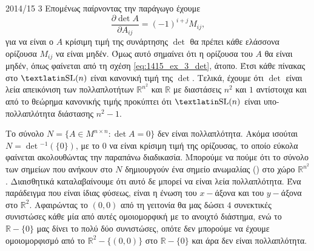 \documentclass[a4paper,11pt]{article}
\begin{document}
\begin{solution}{2014/15 3}
    Επομένως παίρνοντας την παράγωγο έχουμε
    \begin{equation*}
        \dfrac{\partial \det A}{\partial A_{ij}} =
        (-1)^{i+j}M_{ij},
    \end{equation*}
    για να είναι ο \( A \) κρίσιμη τιμή της συνάρτησης \( \det \) θα πρέπει κάθε
    ελάσσονα ορίζουσα \( M_{ij} \) να είναι μηδέν. Όμως αυτό σημαίνει
    ότι η ορίζουσα του \( A \) θα είναι μηδέν, όπως φαίνεται από τη σχέση
    \eqref{eq:1415_ex_3_det}, άτοπο. Έτσι κάθε πίνακας στο \(\text{\tl{SL}}(n)\) είναι
    κανονική τιμή της \( \det \). Τελικά, έχουμε ότι \( \det \) είναι λεία
    απεικόνιση των πολλαπλοτήτων \( \mathbb{R}^{n^2} \) και \( \mathbb{R} \)
    με διαστάσεις \( n^2 \) και \( 1 \) αντίστοιχα και από το θεώρημα κανονικής τιμής
    προκύπτει ότι \(\text{\tl{SL}}(n)\) είναι υπο-πολλαπλότητα διάστασης \( n^2 - 1 \).

    Το σύνολο \( N = \{A \in M^{n \times n}: \det A = 0 \} \) δεν είναι
    πολλαπλότητα. Ακόμα ισούται \( N = \det{}^{-1}(\{0\}) \), με το \(0\) να
    είναι κρίσιμη τιμή της ορίζουσας, το οποίο εύκολα φαίνεται ακολουθώντας την
    παραπάνω διαδικασία. Μπορούμε να πούμε ότι το σύνολο των σημείων που ανήκουν
    στο \(N\) δημιουργούν ένα σημείο ανωμαλίας () στο χώρο
    \(\mathbb{R}^{n^2} \). Διαισθητικά καταλαβαίνουμε ότι αυτό δε μπορεί να είναι
    λεία πολλαπλότητα. Ένα παράδειγμα που είναι ίδιας φύσεως, είναι η ένωση του
    \( x-\)άξονα και του \(y-\)άξονα στο \( \mathbb{R}^2 \). Αφαιρώντας το \((0, 0)\)
    από τη γειτονία θα μας δώσει \(4\) συνεκτικές συνιστώσες κάθε μία από αυτές
    ομοιομορφική με το ανοιχτό διάστημα, ενώ το \( \mathbb{R} - \{0\} \) μας δίνει το
    πολύ δύο συνιστώσες, οπότε δεν μπορούμε να έχουμε ομοιομορφισμό από το
    \( \mathbb{R}^2 -\{(0,0)\}\) στο \( \mathbb{R} -\{0\}\) και άρα δεν είναι πολλαπλότητα.
\end{solution}
\end{document}
